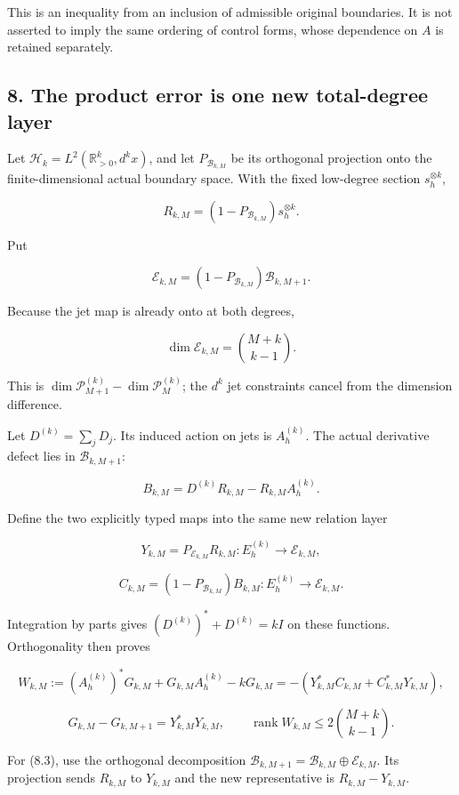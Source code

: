 \documentclass[
]{article}
\begin{document}
This is an inequality from an inclusion of admissible original
boundaries. It is not asserted to imply the same ordering of control
forms, whose dependence on \(A\) is retained separately.

\subsection{8. The product error is one new total-degree
layer}\label{the-product-error-is-one-new-total-degree-layer}

Let \(\mathcal H_k=L^2(\mathbb R_{>0}^k,d^kx)\), and let
\(P_{\mathcal B_{k,M}}\) be its orthogonal projection onto the
finite-dimensional actual boundary space. With the fixed low-degree
section \(s_h^{\otimes k}\),

\[R_{k,M}=(1-P_{\mathcal B_{k,M}})s_h^{\otimes k}.\]

Put

\[\mathcal E_{k,M}=(1-P_{\mathcal B_{k,M}})\mathcal B_{k,M+1}.\]

Because the jet map is already onto at both degrees,

\[\boxed{\dim\mathcal E_{k,M}=\binom{M+k}{k-1}.}\tag{8.1}\]

This is \(\dim\mathcal P_{M+1}^{(k)}-\dim\mathcal P_M^{(k)}\); the
\(d^k\) jet constraints cancel from the dimension difference.

Let \(D^{(k)}=\sum_jD_j\). Its induced action on jets is \(A_h^{(k)}\).
The actual derivative defect lies in \(\mathcal B_{k,M+1}\):

\[B_{k,M}=D^{(k)}R_{k,M}-R_{k,M}A_h^{(k)}.\]

Define the two explicitly typed maps into the same new relation layer

\[Y_{k,M}=P_{\mathcal E_{k,M}}R_{k,M}:E_h^{(k)}\to\mathcal E_{k,M},\]

\[C_{k,M}=(1-P_{\mathcal B_{k,M}})B_{k,M}:E_h^{(k)}\to\mathcal E_{k,M}.\]

Integration by parts gives \((D^{(k)})^*+D^{(k)}=kI\) on these
functions. Orthogonality then proves

\[\boxed{W_{k,M}:=(A_h^{(k)})^*G_{k,M}+G_{k,M}A_h^{(k)}-kG_{k,M}
=-(Y_{k,M}^*C_{k,M}+C_{k,M}^*Y_{k,M}),}\tag{8.2}\]

\[\boxed{G_{k,M}-G_{k,M+1}=Y_{k,M}^*Y_{k,M},\qquad
\operatorname{rank}W_{k,M}\le2\binom{M+k}{k-1}.}\tag{8.3}\]

For (8.3), use the orthogonal decomposition
\(\mathcal B_{k,M+1}=\mathcal B_{k,M}\oplus\mathcal E_{k,M}\). Its
projection sends \(R_{k,M}\) to \(Y_{k,M}\) and the new representative
is \(R_{k,M}-Y_{k,M}\).
\end{document}

